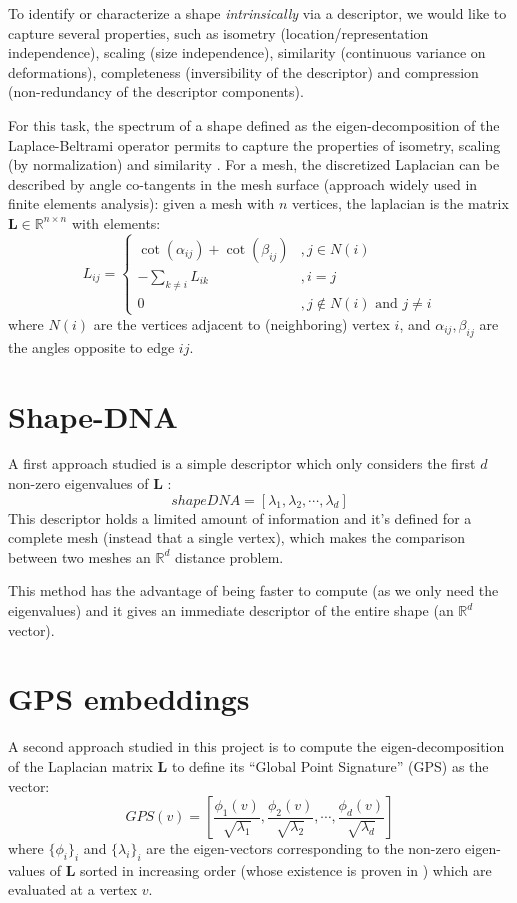 \documentclass[conference]{IEEEtran}
\newcommand{\q}[1]{``#1''} %
\begin{document}
To identify or characterize a shape \emph{intrinsically} via a descriptor, we would like to capture several properties, such as isometry (location/representation independence), scaling (size independence), similarity (continuous variance on deformations), completeness (inversibility of the descriptor) and compression (non-redundancy of the descriptor components). 

For this task, the spectrum of a shape defined as the eigen-decomposition of the Laplace-Beltrami operator permits to capture the properties of isometry, scaling (by normalization) and similarity \cite{Maks11}. For a mesh, the discretized Laplacian can be described by angle co-tangents in the mesh surface (approach widely used in finite elements analysis): given a mesh with $n$ vertices, the laplacian is the matrix $\mathbf{L}\in \mathbb{R}^{n\times n}$ \cite{Rustamov07} with elements:
$$L_{ij} = \begin{cases}\cot(\alpha_{ij}) + \cot(\beta_{ij}) &, j \in N(i) \\
-\sum\limits_{k\neq i} L_{ik} &, i = j \\
0 &, j \notin N(i) \text{ and } j \neq i
\end{cases}$$
where $N(i)$ are the vertices adjacent to (neighboring) vertex $i$, and $\alpha_{ij},\beta_{ij}$ are the angles opposite to edge $ij$.


\section{Shape-DNA}

A first approach studied is a simple descriptor which only considers the first $d$ non-zero eigenvalues of $\mathbf{L}$ \cite{Reuter06}:
$$shapeDNA = \left[\lambda_1, \lambda_2, \cdots, \lambda_d \right]$$
This descriptor holds a limited amount of information and it's defined for a complete mesh (instead that a single vertex), which makes the comparison between two meshes an $\mathbb{R}^d$ distance problem.

This method has the advantage of being faster to compute (as we only need the eigenvalues) and it gives an immediate descriptor of the entire shape (an $\mathbb{R}^d$ vector). 

\section{GPS embeddings}
\label{GPS_section}
A second approach studied in this project is to compute the eigen-decomposition of the Laplacian matrix $\mathbf{L}$ to define its \q{Global Point Signature} (GPS) as the vector:
$$GPS(v) = \left[\frac{\phi_1(v)}{\sqrt{\lambda_1}}, \frac{\phi_2(v)}{\sqrt{\lambda_2}}, \cdots, \frac{\phi_d(v)}{\sqrt{\lambda_d}}\right]$$
where $\{\phi_i\}_i$ and $\{\lambda_i\}_i$ are the eigen-vectors corresponding to the non-zero eigen-values of $\mathbf{L}$ sorted in increasing order (whose existence is proven in \cite{Rustamov07})  which are evaluated at a vertex $v$. 
\end{document}
